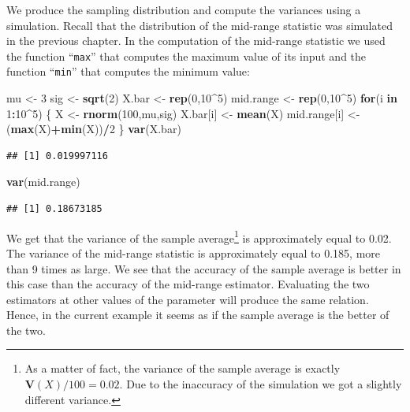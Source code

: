\documentclass[]{krantz}
\makeatletter
\newenvironment{Shaded}{\begin{snugshade}}{\end{snugshade}}
\newcommand{\ControlFlowTok}[1]{\textcolor[rgb]{0.13,0.29,0.53}{\textbf{#1}}}
\newcommand{\DecValTok}[1]{\textcolor[rgb]{0.00,0.00,0.81}{#1}}
\newcommand{\KeywordTok}[1]{\textcolor[rgb]{0.13,0.29,0.53}{\textbf{#1}}}
\newcommand{\NormalTok}[1]{#1}
\newcommand{\OperatorTok}[1]{\textcolor[rgb]{0.81,0.36,0.00}{\textbf{#1}}}
\newcommand{\StringTok}[1]{\textcolor[rgb]{0.31,0.60,0.02}{#1}}
\newcommand{\Var}{\mathbf{V}}
\newenvironment{kframe}{%
\medskip{}
\setlength{\fboxsep}{.8em}
 \def\at@end@of@kframe{}%
 \ifinner\ifhmode%
  \def\at@end@of@kframe{\end{minipage}}%
  \begin{minipage}{\columnwidth}%
 \fi\fi%
 \def\FrameCommand##1{\hskip\@totalleftmargin \hskip-\fboxsep
 \colorbox{shadecolor}{##1}\hskip-\fboxsep
     \hskip-\linewidth \hskip-\@totalleftmargin \hskip\columnwidth}%
 \MakeFramed {\advance\hsize-\width
   \@totalleftmargin\z@ \linewidth\hsize
   \@setminipage}}%
 {\par\unskip\endMakeFramed%
 \at@end@of@kframe}
\renewenvironment{Shaded}{\begin{kframe}}{\end{kframe}}
\theoremstyle{definition}
\theoremstyle{definition}
\theoremstyle{definition}
\theoremstyle{remark}
\makeatother
\begin{document}
We produce the sampling distribution and compute the variances using a
simulation. Recall that the distribution of the mid-range statistic was
simulated in the previous chapter. In the computation of the mid-range
statistic we used the function ``\texttt{max}'' that computes the maximum value
of its input and the function ``\texttt{min}'' that computes the minimum value:

\begin{Shaded}
\begin{Highlighting}[]
\NormalTok{mu <-}\StringTok{ }\DecValTok{3}
\NormalTok{sig <-}\StringTok{ }\KeywordTok{sqrt}\NormalTok{(}\DecValTok{2}\NormalTok{)}
\NormalTok{X.bar <-}\StringTok{ }\KeywordTok{rep}\NormalTok{(}\DecValTok{0}\NormalTok{,}\DecValTok{10}\OperatorTok{^}\DecValTok{5}\NormalTok{)}
\NormalTok{mid.range <-}\StringTok{ }\KeywordTok{rep}\NormalTok{(}\DecValTok{0}\NormalTok{,}\DecValTok{10}\OperatorTok{^}\DecValTok{5}\NormalTok{)}
\ControlFlowTok{for}\NormalTok{(i }\ControlFlowTok{in} \DecValTok{1}\OperatorTok{:}\DecValTok{10}\OperatorTok{^}\DecValTok{5}\NormalTok{) \{}
\NormalTok{  X <-}\StringTok{ }\KeywordTok{rnorm}\NormalTok{(}\DecValTok{100}\NormalTok{,mu,sig)}
\NormalTok{  X.bar[i] <-}\StringTok{ }\KeywordTok{mean}\NormalTok{(X)}
\NormalTok{  mid.range[i] <-}\StringTok{ }\NormalTok{(}\KeywordTok{max}\NormalTok{(X)}\OperatorTok{+}\KeywordTok{min}\NormalTok{(X))}\OperatorTok{/}\DecValTok{2}
\NormalTok{\}}
\KeywordTok{var}\NormalTok{(X.bar)}
\end{Highlighting}
\end{Shaded}

\begin{verbatim}
## [1] 0.019997116
\end{verbatim}

\begin{Shaded}
\begin{Highlighting}[]
\KeywordTok{var}\NormalTok{(mid.range)}
\end{Highlighting}
\end{Shaded}

\begin{verbatim}
## [1] 0.18673185
\end{verbatim}

We get that the variance of the sample average\footnote{As a matter of fact, the variance of the sample average is exactly
  \(\Var(X)/100 = 0.02\). Due to the inaccuracy of the simulation we got
  a slightly different variance.} is approximately
equal to 0.02. The variance of the mid-range statistic is approximately
equal to 0.185, more than 9 times as large. We see that the accuracy of
the sample average is better in this case than the accuracy of the
mid-range estimator. Evaluating the two estimators at other values of
the parameter will produce the same relation. Hence, in the current
example it seems as if the sample average is the better of the two.
\end{document}
